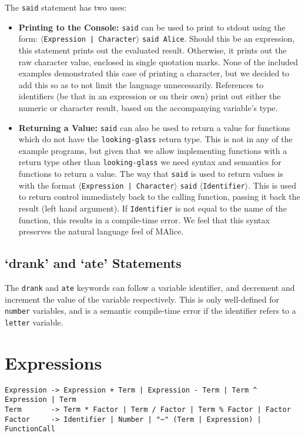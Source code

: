 \documentclass[a4wide, 11pt]{article}
\begin{document}
The \texttt{said} statement has two uses:
\begin{itemize}
\item \textbf{Printing to the Console:} \texttt{said} can be used to print to stdout using the form: $\langle$\texttt{Expression | Character}$\rangle$ \texttt{said Alice}. Should this be an expression, this statement prints out the evaluated result. Otherwise, it prints out the raw character value, enclosed in single quotation marks. None of the included examples demonstrated this case of printing a character, but we decided to add this so as to not limit the language unnecessarily. References to identifiers (be that in an expression or on their own) print out either the numeric or character result, based on the accompanying variable's type.
\item \textbf{Returning a Value:} \texttt{said} can also be used to return a value for functions which do not have the \texttt{looking-glass} return type. This is not in any of the example programs, but given that we allow implementing functions with a return type other than \texttt{looking-glass} we need syntax and semantics for functions to return a value. The way that \texttt{said} is used to return values is with the format $\langle$\texttt{Expression | Character}$\rangle$ \texttt{said} $\langle$\texttt{Identifier}$\rangle$. This is used to return control immediately back to the calling function, passing it back the result (left hand argument). If \texttt{Identifier} is not equal to the name of the function, this results in a compile-time error. We feel that this syntax preserves the natural language feel of MAlice.
\end{itemize}

\subsection{`drank' and `ate' Statements}

The \texttt{drank} and \texttt{ate} keywords can follow a variable identifier, and decrement and increment the value of the variable respectively. This is only well-defined for \texttt{number} variables, and is a semantic compile-time error if the identifier refers to a \texttt{letter} variable.
  
\section{Expressions}

\begin{verbatim}
Expression -> Expression + Term | Expression - Term | Term ^ Expression | Term
Term       -> Term * Factor | Term / Factor | Term % Factor | Factor
Factor     -> Identifier | Number | "~" (Term | Expression) | FunctionCall

\end{verbatim}
\end{document}
